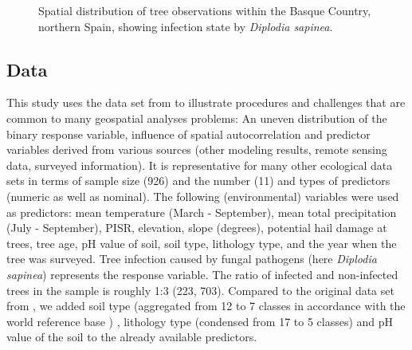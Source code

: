 \documentclass[review]{elsarticle}
\begin{document}
\begin{figure} [t!]
	\begin{center}
		\caption[Study area]{Spatial distribution of tree observations within the Basque Country, northern Spain, showing infection state by \textit{Diplodia sapinea}.}
		\label{fig: study_area}
	\end{center}
\end{figure}

\subsection{Data}

This study uses the data set from \cite{Iturritxa2014} to illustrate procedures and challenges that are common to many geospatial analyses problems:
An uneven distribution of the binary response variable, influence of spatial autocorrelation and predictor variables derived from various sources (other modeling results, remote sensing data, surveyed information).
It is representative for many other ecological data sets in terms of sample size (926) and the number (11) and types of predictors (numeric as well as nominal).
The following (environmental) variables were used as predictors: mean temperature (March - September), mean total precipitation (July - September), \ac{PISR}, elevation, slope (degrees), potential hail damage at trees, tree age, pH value of soil, soil type, lithology type, and the year when the tree was surveyed.
Tree infection caused by fungal pathogens (here \textit{Diplodia sapinea}) represents the response variable.
The ratio of infected and non-infected trees in the sample is roughly 1:3 (223, 703).
Compared to the original data set from \cite{Iturritxa2014}, we added soil type (aggregated from 12 to 7 classes in accordance with the world reference base \citep{wrb2014}) \citep{Hengl2017}, lithology type (condensed from 17 to 5 classes) \citep{lithology} and pH value of the soil \citep{ph} to the already available predictors.
\end{document}
